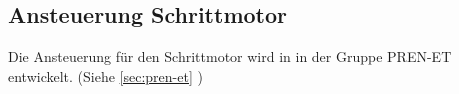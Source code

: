 \subsection{Ansteuerung Schrittmotor}
Die Ansteuerung für den Schrittmotor wird in in der Gruppe PREN-ET entwickelt. 
(Siehe \ref{sec:pren-et} )

